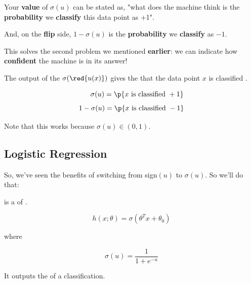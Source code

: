         Your \textbf{value} of $\sigma(u)$ can be stated as, "what does the machine think is the \textbf{probability} we \textbf{classify} this data point as +1".
        
        And, on the \textbf{flip} side, $1-\sigma(u)$ is the \textbf{probability} we \textbf{classify} as $-1$.
        
        This solves the second problem we mentioned \textbf{earlier}: we can indicate how \textbf{confident} the machine is in its answer!\\
        
        \begin{concept}
            The output of the  $\sigma(\red{u(x)})$ gives the  that the data point $x$ is classified .
            
            \begin{equation*}
                \quad \;\; \sigma(u) = \p{ x\text{ is classified }+1 }
            \end{equation*}
            \begin{equation*}
                1 - \sigma(u) = \p{ x\text{ is classified }-1 }
            \end{equation*}
            
            Note that this works because $\sigma(u) \in (0,1)$.
        \end{concept}
        
    \subsection*{Logistic Regression}
    
        So, we've seen the benefits of switching from sign$(u)$ to $\sigma(u)$. So we'll do that:
            \\
        
        
        \begin{kequation}
             is a  of .
            
            \begin{equation*}
                h(x; \theta) = \sigma(\theta^T x + \theta_0 )
            \end{equation*}
        
            \centerline{where}
            
            \begin{equation*}
                \sigma(u) = \frac{1}{1+e^{-u}}
            \end{equation*}
            
            It outputs the  of a  classification.
        \end{kequation}
        
